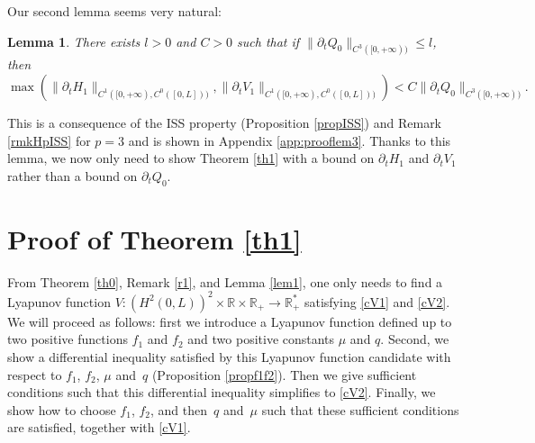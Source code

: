 \documentclass[11pt]{article}
\numberwithin{equation}{section}
\newtheorem{lem}[thm]{Lemma}
\theoremstyle{definition}
\begin{document}
Our second lemma seems very natural:
\begin{lem}\label{lem3}
There exists $l>0$ and $C>0$
such that if $\lVert\partial_{t}Q_{0}\rVert_{C^{3}([0,+\infty))}\leq l$, then
\begin{equation*}
\max\left(\lVert\partial_{t}H_{1}\rVert_{C^{1}([0,+\infty), {C^{0}([0,L])})},\lVert\partial_{t}V_{1}\rVert_{C^{1}([0,+\infty), {C^{0}([0,L])})}\right)< C \lVert\partial_{t}Q_{0}\rVert_{C^{3}([0,+\infty))}.
\end{equation*}
\end{lem}
This is a consequence of the ISS property (Proposition \ref{propISS}) and Remark \ref{rmkHpISS} for $p=3$ and is shown in Appendix \ref{app:prooflem3}.
Thanks to this lemma, we now only need to show Theorem \ref{th1} with a bound on $\partial_{t}H_{1}$ and $\partial_{t}V_{1}$ rather than a bound on $\partial_{t}Q_{0}$.

\section{{Proof of Theorem \ref{th1}}}
\label{sec:proofth1}
From Theorem {\ref{th0}}, Remark \ref{r1}, and Lemma \ref{lem1}, one only needs to find a Lyapunov function $V: (H^{2}(0,L))^{2}\times\mathbb{R}\times\mathbb{R}_{+}\to \mathbb{R}_{+}^{*}$ satisfying \eqref{cV1} and \eqref{cV2}.
{We will proceed as follows: first we introduce a Lyapunov function defined up to two positive functions $f_{1}$ and $f_{2}$ and two positive constants $\mu$ and $q$. Second, we show a differential inequality satisfied by this Lyapunov function candidate with respect to $f_{1}$, $f_{2}$, $\mu$ and~$q$ (Proposition \ref{propf1f2}). Then we give sufficient conditions such that this differential inequality simplifies to \eqref{cV2}. Finally, we show how to choose $f_{1}$, $f_{2}$, and then~$q$ and~$\mu$ such that these sufficient conditions are satisfied, together with \eqref{cV1}.}
\end{document}
